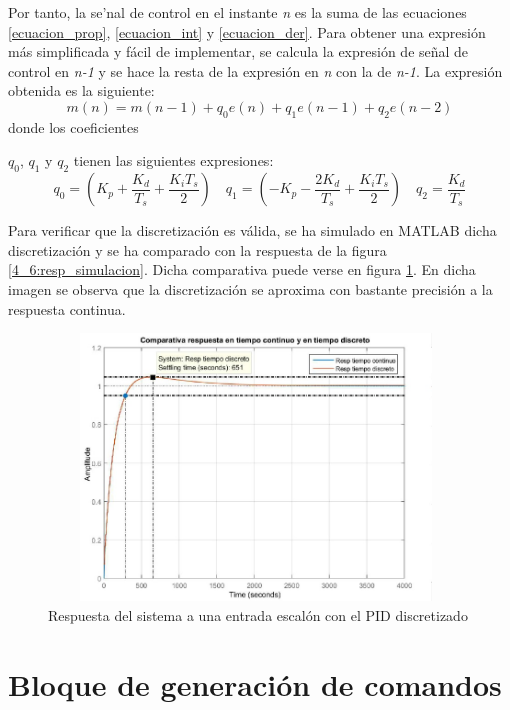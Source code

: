 	Por tanto, la se'nal de control en el instante \textit{n} es la suma de las ecuaciones \ref{ecuacion_prop}, \ref{ecuacion_int} y \ref{ecuacion_der}. Para obtener una expresión más simplificada y fácil de implementar, se calcula la expresión de señal de control en \textit{n-1} y se hace la resta de la expresión en \textit{n} con la de \textit{n-1}. La expresión obtenida es la siguiente:
\begin{equation}\label{ecuacion4_6}
		m(n) = m(n-1) + q_{0} e(n) + q_{1} e(n-1) + q_{2} e(n-2)   
\end{equation}
	donde los coeficientes {$q_{0}$, $q_{1}$  y $q_{2}$ tienen las siguientes expresiones:\\
\begin{equation}\label{ecuacion4_7}
		q_{0} = \left( K_{p} + \frac{K_{d}}{T_{s}} +  \frac{K_{i}T_{s}}{2} \right) \quad q_{1} = \left( - K_{p} - \frac{2K_{d}}{T_{s}} +  \frac{K_{i}T_{s}}{2} \right)  \quad q_{2} = \frac{K_{d}}{T_{s}}
\end{equation}

	Para verificar que la discretización es válida, se ha simulado en MATLAB dicha discretización y se ha comparado con la respuesta de la figura \ref{4_6:resp_simulacion}. Dicha comparativa puede verse en figura \ref{4_7:discretizacionPID}. En dicha imagen se observa que la discretización se aproxima con bastante precisión a la respuesta continua.

\begin{figure}[h]
  \centering
  \includegraphics[width=110mm, height=71mm]{imagenes/capitulo4/4_7Resp_Lazo_Cerrado_Discreto}
   \caption{Respuesta del sistema a una entrada escalón con el PID discretizado}
   \label{4_7:discretizacionPID}
\end{figure}

\section{Bloque de generación de comandos}\label{sec:comandos}

}
